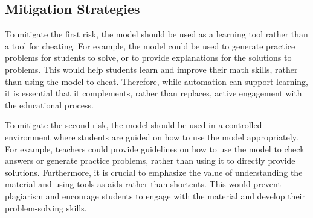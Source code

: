 \documentclass{article}
\begin{document}
\subsection{Mitigation Strategies}
To mitigate the first risk, the model should be used as a learning tool rather than a tool for cheating. For example, the model could be used to generate practice problems for students to solve, or to provide explanations for the solutions to problems. This would help students learn and improve their math skills, rather than using the model to cheat. Therefore, while automation can support learning, it is essential that it complements, rather than replaces, active engagement with the educational process.

To mitigate the second risk, the model should be used in a controlled environment where students are guided on how to use the model appropriately. For example, teachers could provide guidelines on how to use the model to check answers or generate practice problems, rather than using it to directly provide solutions. Furthermore, it is crucial to emphasize the value of understanding the material and using tools as aids rather than shortcuts. This would prevent plagiarism and encourage students to engage with the material and develop their problem-solving skills.


\end{document}
